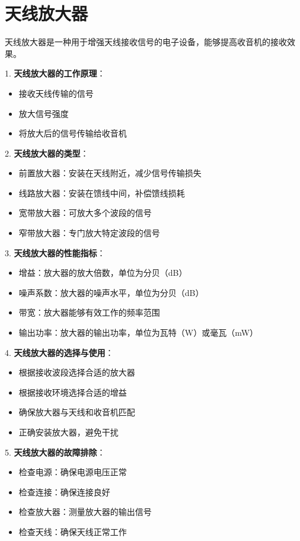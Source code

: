 \documentclass[12pt,UTF8]{ctexbook}
\begin{document}
\section{天线放大器}

天线放大器是一种用于增强天线接收信号的电子设备，能够提高收音机的接收效果。

1. \textbf{天线放大器的工作原理}：
   \begin{itemize}[leftmargin=3.5em]
   \item 接收天线传输的信号
   \item 放大信号强度
   \item 将放大后的信号传输给收音机
   \end{itemize}

2. \textbf{天线放大器的类型}：
   \begin{itemize}[leftmargin=3.5em]
   \item 前置放大器：安装在天线附近，减少信号传输损失
   \item 线路放大器：安装在馈线中间，补偿馈线损耗
   \item 宽带放大器：可放大多个波段的信号
   \item 窄带放大器：专门放大特定波段的信号
   \end{itemize}

3. \textbf{天线放大器的性能指标}：
   \begin{itemize}[leftmargin=3.5em]
   \item 增益：放大器的放大倍数，单位为分贝（dB）
   \item 噪声系数：放大器的噪声水平，单位为分贝（dB）
   \item 带宽：放大器能够有效工作的频率范围
   \item 输出功率：放大器的输出功率，单位为瓦特（W）或毫瓦（mW）
   \end{itemize}

4. \textbf{天线放大器的选择与使用}：
   \begin{itemize}[leftmargin=3.5em]
   \item 根据接收波段选择合适的放大器
   \item 根据接收环境选择合适的增益
   \item 确保放大器与天线和收音机匹配
   \item 正确安装放大器，避免干扰
   \end{itemize}

5. \textbf{天线放大器的故障排除}：
   \begin{itemize}[leftmargin=3.5em]
   \item 检查电源：确保电源电压正常
   \item 检查连接：确保连接良好
   \item 检查放大器：测量放大器的输出信号
   \item 检查天线：确保天线正常工作
   \end{itemize}
\end{document}

